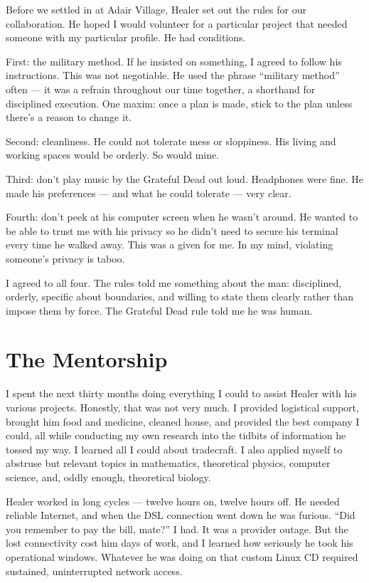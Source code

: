 Before we settled in at Adair Village, Healer set out the rules for our collaboration. He hoped I would volunteer for a particular project that needed someone with my particular profile. He had conditions.

First: the military method. If he insisted on something, I agreed to follow his instructions. This was not negotiable. He used the phrase ``military method'' often --- it was a refrain throughout our time together, a shorthand for disciplined execution. One maxim: once a plan is made, stick to the plan unless there's a reason to change it.

Second: cleanliness. He could not tolerate mess or sloppiness. His living and working spaces would be orderly. So would mine.

Third: don't play music by the Grateful Dead out loud. Headphones were fine. He made his preferences --- and what he could tolerate --- very clear.

Fourth: don't peek at his computer screen when he wasn't around. He wanted to be able to trust me with his privacy so he didn't need to secure his terminal every time he walked away. This was a given for me. In my mind, violating someone's privacy is taboo.

I agreed to all four. The rules told me something about the man: disciplined, orderly, specific about boundaries, and willing to state them clearly rather than impose them by force. The Grateful Dead rule told me he was human.

\section*{The Mentorship}
\label{pos02:the-mentorship}

I spent the next thirty months doing everything I could to assist Healer with his various projects. Honestly, that was not very much. I provided logistical support, brought him food and medicine, cleaned house, and provided the best company I could, all while conducting my own research into the tidbits of information he tossed my way. I learned all I could about tradecraft. I also applied myself to abstruse but relevant topics in mathematics, theoretical physics, computer science, and, oddly enough, theoretical biology.

Healer worked in long cycles --- twelve hours on, twelve hours off. He needed reliable Internet, and when the DSL connection went down he was furious. ``Did you remember to pay the bill, mate?'' I had. It was a provider outage. But the lost connectivity cost him days of work, and I learned how seriously he took his operational windows. Whatever he was doing on that custom Linux CD required sustained, uninterrupted network access.


